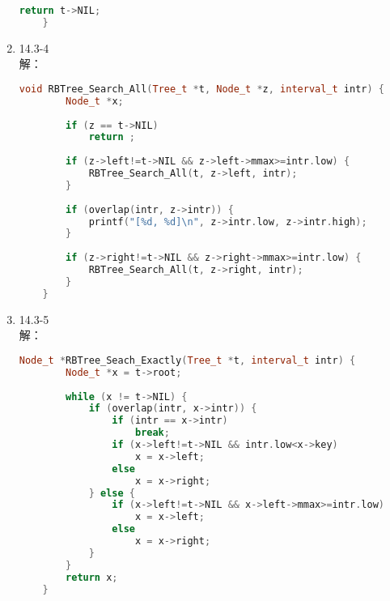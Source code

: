 \documentclass[UTF8]{ctexart}
\begin{document}
\begin{enumerate}
\begin{lstlisting}[language=c++]
		return t->NIL;
	}
	\end{lstlisting}
	
	\item 14.3-4 \\
	解：
	\begin{lstlisting}[language=C++]
	void RBTree_Search_All(Tree_t *t, Node_t *z, interval_t intr) {
		Node_t *x;
		
		if (z == t->NIL)
			return ;
		
		if (z->left!=t->NIL && z->left->mmax>=intr.low) {
			RBTree_Search_All(t, z->left, intr);
		}
		
		if (overlap(intr, z->intr)) {
			printf("[%d, %d]\n", z->intr.low, z->intr.high);
		}
		
		if (z->right!=t->NIL && z->right->mmax>=intr.low) {
			RBTree_Search_All(t, z->right, intr);
		}
	}
	\end{lstlisting}
	
	\item 14.3-5 \\
	解：
	\begin{lstlisting}[language=C++]
	Node_t *RBTree_Seach_Exactly(Tree_t *t, interval_t intr) {
		Node_t *x = t->root;
		
		while (x != t->NIL) {
			if (overlap(intr, x->intr)) {
				if (intr == x->intr)
					break;
				if (x->left!=t->NIL && intr.low<x->key)
					x = x->left;
				else
					x = x->right;
			} else {
				if (x->left!=t->NIL && x->left->mmax>=intr.low)
					x = x->left;
				else
					x = x->right;
			}
		}
		return x;
	}
	\end{lstlisting}
	
\end{enumerate}
\end{document}
